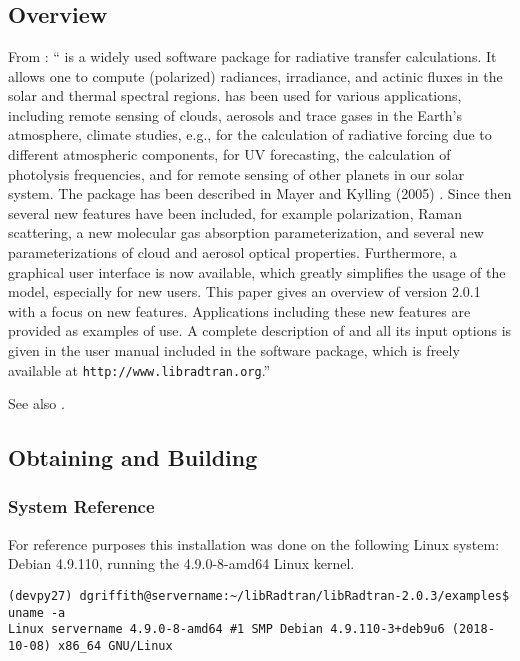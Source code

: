 

\chapter{\libradtran{}}
\label{chap:libRadtran}


\section{\libradtran{} Overview}

From \cite{EmdeLibRadtran2016}:
``\libradtran{} is a widely used software package for
radiative transfer calculations. It allows one to compute (polarized) radiances, irradiance, and actinic fluxes in the solar and thermal spectral regions. \libradtran{} has been used
for various applications, including remote sensing of clouds,
aerosols and trace gases in the Earth’s atmosphere, climate
studies, e.g., for the calculation of radiative forcing due to
different atmospheric components, for UV forecasting, the
calculation of photolysis frequencies, and for remote sensing
of other planets in our solar system. The package has been
described in Mayer and Kylling (2005) \cite{libRadtran2005}. Since then several
new features have been included, for example polarization,
Raman scattering, a new molecular gas absorption parameterization, and several new parameterizations of cloud and
aerosol optical properties. Furthermore, a graphical user interface is now available, which greatly simplifies the usage
of the model, especially for new users. This paper gives an
overview of \libradtran{} version 2.0.1 with a focus on new features. Applications including these new features are provided
as examples of use. A complete description of \libradtran{} and
all its input options is given in the user manual included in
the \libradtran{} software package, which is freely available at
\lstinline{http://www.libradtran.org}.''

See also 
\cite{libRadtran2005,libRadTranUserGuide2012,libRadtranDownload2020,libRadtranmuenchen2020}.


\section{Obtaining and Building \libradtran{}}

\subsection{System Reference}
For reference purposes this installation was done on the following Linux system: Debian 4.9.110, running the 4.9.0-8-amd64 Linux kernel.
\begin{lstlisting}[style=tinysize]
(devpy27) dgriffith@servername:~/libRadtran/libRadtran-2.0.3/examples$ uname -a
Linux servername 4.9.0-8-amd64 #1 SMP Debian 4.9.110-3+deb9u6 (2018-10-08) x86_64 GNU/Linux
\end{lstlisting}

